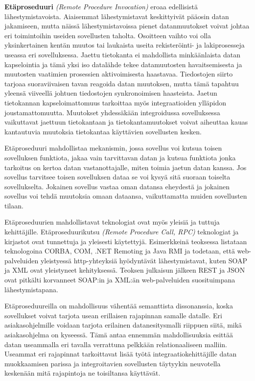 \textbf{Etäproseduuri} \textit{(Remote Procedure Invocation)} eroaa edellisistä lähestymistavoista. Aiaisemmat lähestymistavat keskittyivät pääosin datan jakamiseen, mutta näissä lähestymistavoissa pienet datanmuutokset voivat johtaa eri toimintoihin useiden sovellusten taholta. Osoitteen vaihto voi olla yksinkertainen kentän muutos tai laukaista useita rekisteröinti- ja lakiprosesseja useassa eri sovelluksessa. Jaettu tietokanta ei mahdollista minkäänlaista datan kapselointia ja tämä yksi iso datalähde tekee datamuutosten havaitsemisesta ja muutosten vaatimien prosessien aktivoimisesta haastavaa. Tiedostojen siirto tarjoaa suoraviivaisen tavan reagoida datan muutoksen, mutta tämä tapahtuu yleensä viiveellä johtuen tiedostojen synkronoimisen haasteista.
Jaetun tietokannan kapseloimattomuus tarkoittaa myös integraatioiden ylläpidon joustamattomuutta. Muutokset yhdessäkään integroidussa sovelluksessa vaikuttavat jaettuun tietokantaan ja tietokantamuutokset voivat aiheuttaa kauas kantautuvia muutoksia tietokantaa käyttävien sovellusten kesken.

Etäproseduuri mahdollistaa mekanismin, jossa sovellus voi kutsua toisen sovelluksen funktiota, jakaa vain tarvittavan datan ja kutsua funktiota jonka tarkoitus on kertoa datan vastanottajalle, miten toimia jaetun datan kanssa.
Jos sovellus tarvitsee toisen sovelluksen dataa se voi kysyä sitä suoraan toiselta sovellukselta. 
Jokainen sovellus vastaa oman datansa eheydestä ja jokainen sovellus voi tehdä muutoksia omaan dataansa, vaikuttamatta muiden sovellusten tilaan.

Etäproseduurien mahdollistavat teknologiat ovat myös yleisiä ja tuttuja kehittäjille. Etäproseduurikutsu \textit{(Remote Procedure Call, RPC)} teknologiat ja kirjastot ovat tunnettuja ja yleisesti käytettyjä. Esimerkkeinä teoksessa \citep[sivu~71]{Hohpe2004} listataan teknologoina CORBA, COM, .NET Remoting ja Java RMI ja todetaan, että web-palveluiden yleistyessä http-yhteyksiä hyödyntävät lähestymistavat, kuten SOAP ja XML ovat yleistyneet kehityksessä. 
Teoksen julkaisun jälkeen REST ja JSON ovat pitkälti korvanneet SOAP:in ja XML:än web-palveluiden suosituimpana lähestymistapana.

Etäproseduureilla on mahdollisuus vähentää  semanttista dissonanssia, koska sovellukset voivat tarjota usean erillaisen rajapinnan samalle datalle. Eri asiakasohjelmille voidaan tarjota erilainen datanesitysmalli riippuen siitä, mikä asiakasohjelma on kyseessä. Tämä antaa ennemmän mahdollisuuksia esittää datan useammalla eri tavalla verrattuna pelkkään relationaaliseen malliin.
Useammat eri rajapinnat tarkoittavat lisää työtä integraatiokehittäjille datan muokkaamisen parissa ja integroitavien sovellusten täytyykin neuvotella keskenään mitä rajapintoja ne toisiltansa käyttävät.

